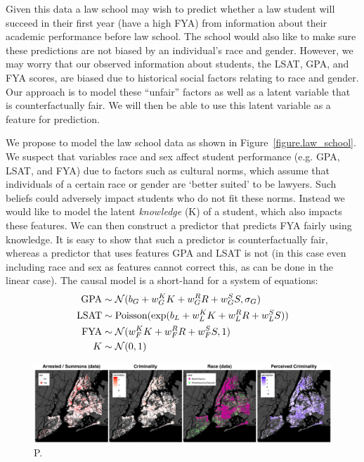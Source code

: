 Given this data a law school may wish to predict whether a law student
will succeed in their first year (have a high FYA) from information about their academic performance 
before law school. The school would also like to make sure
these predictions are not biased by an individual's race and
gender. However, we may worry that our observed information about
students, the LSAT, GPA, and FYA scores, are biased due to historical
social factors relating to race and gender. Our approach is to model these
``unfair'' factors as well as a latent variable that is counterfactually
fair. We will then be able to use this latent variable as a feature
for prediction.

We propose to model the law school data as shown in
Figure~\ref{figure.law_school}. We suspect that variables race and sex
affect student performance (e.g. GPA, LSAT, and FYA) due to factors
such as cultural norms, which assume that individuals of a certain
race or gender are `better suited' to be lawyers. Such beliefs could
adversely impact students who do not fit these norms. Instead we would
like to model the latent \emph{knowledge} (K) of a student, which also
impacts these features. We can then construct a predictor that
predicts FYA fairly using knowledge. It is easy to show that such a predictor
is counterfactually fair, whereas a predictor that uses features GPA and
LSAT is not (in this case even including race and sex as
features cannot correct this, as can be done in the linear case). The
causal model is a short-hand for a system of equations:
\begin{align}
\mbox{GPA} &\sim {\cal N}(b_{G} + w_{G}^K K + w_{G}^R R + w_{G}^S S, \sigma_{G}) \nonumber \\
\mbox{LSAT} &\sim \textrm{Poisson}(\exp(b_{L} + w_{L}^K K + w_{L}^R R + w_{L}^S S)) \nonumber \\
\mbox{FYA} &\sim {\cal N}(w_{F}^K K + w_{F}^R R + w_{F}^S S, 1) \nonumber \\
K &\sim {\cal N}(0,1) \nonumber
\end{align}



 

\begin{figure}[th]
\begin{center}
\vspace{-2ex}
\centerline{\includegraphics[width=\textwidth]{stop_and_frisk_graphs.png}}
\vspace{-2ex}
\caption{P.}
\label{figure.criminality}
\vspace{-2ex}
\end{center}
\end{figure}

